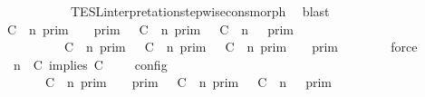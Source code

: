 \begin{isabellebody}
\ \ \ \ \ \ \ \ \ \ \ \ TESL{\isacharunderscore}interpretation{\isacharunderscore}stepwise{\isacharunderscore}cons{\isacharunderscore}morph\ \isamarkupfalse%
\ blast\isanewline
\ \ \ \ \isamarkupfalse%
\ {\isacartoucheopen}{\isasymlbrakk}\ C\ {\isasymnot}{\isasymUp}\ n\ {\isasymrbrakk}\isactrlsub p\isactrlsub r\isactrlsub i\isactrlsub m\ {\isasyminter}\ {\isasymlbrakk}{\isasymlbrakk}\ {\isasymGamma}\ {\isasymrbrakk}{\isasymrbrakk}\isactrlsub p\isactrlsub r\isactrlsub i\isactrlsub m\ {\isasymunion}\ {\isasymlbrakk}\ C\ {\isasymUp}\ n\ {\isasymrbrakk}\isactrlsub p\isactrlsub r\isactrlsub i\isactrlsub m\ {\isasyminter}\ {\isasymlbrakk}{\isasymlbrakk}\ {\isacharparenleft}C\ {\isasymUp}\ n{\isacharparenright}\ {\isacharhash}\ {\isasymGamma}\ {\isasymrbrakk}{\isasymrbrakk}\isactrlsub p\isactrlsub r\isactrlsub i\isactrlsub m\isanewline
\ \ \ \ \ \ \ \ \ {\isacharequal}\ {\isacharparenleft}{\isasymlbrakk}\ C\ {\isasymnot}{\isasymUp}\ n\ {\isasymrbrakk}\isactrlsub p\isactrlsub r\isactrlsub i\isactrlsub m\ {\isasymunion}\ {\isasymlbrakk}\ C\ {\isasymUp}\ n\ {\isasymrbrakk}\isactrlsub p\isactrlsub r\isactrlsub i\isactrlsub m\ {\isasyminter}\ {\isasymlbrakk}\ C\ {\isasymUp}\ n\ {\isasymrbrakk}\isactrlsub p\isactrlsub r\isactrlsub i\isactrlsub m{\isacharparenright}\ {\isasyminter}\ {\isasymlbrakk}{\isasymlbrakk}\ {\isasymGamma}\ {\isasymrbrakk}{\isasymrbrakk}\isactrlsub p\isactrlsub r\isactrlsub i\isactrlsub m{\isacartoucheclose}\isanewline
\ \ \ \ \ \ \isamarkupfalse%
\ force\isanewline
\ \ \ \ \isamarkupfalse%
\ {\isacartoucheopen}{\isasymlbrakk}\ {\isasymGamma}{\isacharcomma}\ n\ {\isasymturnstile}\ {\isacharparenleft}{\isacharparenleft}C\ implies\ C\ {\isacharhash}\ {\isasymPsi}{\isacharparenright}\ {\isasymtriangleright}\ {\isasymPhi}\ {\isasymrbrakk}\isactrlsub c\isactrlsub o\isactrlsub n\isactrlsub f\isactrlsub i\isactrlsub g\isanewline
\ \ \ \ \ \ {\isacharequal}\ {\isacharparenleft}{\isasymlbrakk}\ C\ {\isasymnot}{\isasymUp}\ n\ {\isasymrbrakk}\isactrlsub p\isactrlsub r\isactrlsub i\isactrlsub m\ {\isasyminter}\ {\isasymlbrakk}{\isasymlbrakk}\ {\isasymGamma}\ {\isasymrbrakk}{\isasymrbrakk}\isactrlsub p\isactrlsub r\isactrlsub i\isactrlsub m\ {\isasymunion}\ {\isasymlbrakk}\ C\ {\isasymUp}\ n\ {\isasymrbrakk}\isactrlsub p\isactrlsub r\isactrlsub i\isactrlsub m\ {\isasyminter}\ {\isasymlbrakk}{\isasymlbrakk}\ {\isacharparenleft}C\ {\isasymUp}\ n{\isacharparenright}\ {\isacharhash}\ {\isasymGamma}\ {\isasymrbrakk}{\isasymrbrakk}\isactrlsub p\isactrlsub r\isactrlsub i\isactrlsub m{\isacharparenright}\isanewline

\end{isabellebody}
